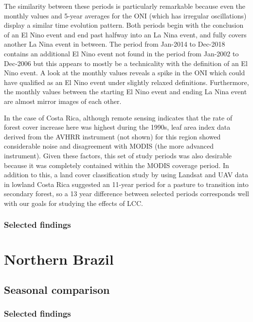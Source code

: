 The similarity between these periods is particularly remarkable because even the monthly values and 5-year averages for the \ac{ONI} (which has irregular oscillations) display a similar time evolution pattern. Both periods begin with the conclusion of an El Nino event and end past halfway into an La Nina event, and fully covers another La Nina event in between. The period from Jan-2014 to Dec-2018 contains an additional El Nino event not found in the period from Jan-2002 to Dec-2006 but this appears to mostly be a technicality with the definition of an El Nino event. A look at the monthly values reveals a spike in the \ac{ONI} which could have qualified as an El Nino event under slightly relaxed definitions. Furthermore, the monthly values between the starting El Nino event and ending La Nina event are almost mirror images of each other.

In the case of Costa Rica, although remote sensing indicates that the rate of forest cover increase here was highest during the 1990s, leaf area index data derived from the \ac{AVHRR} instrument (not shown) for this region showed considerable noise and disagreement with \ac{MODIS} (the more advanced instrument). Given these factors, this set of study periods was also desirable because it was completely contained within the \ac{MODIS} coverage period. In addition to this, a land cover classification study by \citet{marx2017} using Landsat and \ac{UAV} data in lowland Costa Rica suggested an 11-year period for a pasture to transition into secondary forest, so a 13 year difference between selected periods corresponds well with our goals for studying the effects of \ac{LCC}.

\subsubsection{Selected findings}

\section{Northern Brazil}

\subsection{Seasonal comparison}

\subsubsection{Selected findings}


